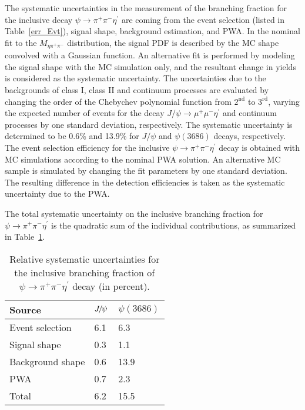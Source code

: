 \documentclass[twocolumn,showpacs,aps,prd]{revtex4-1}
\newcommand{\psip}{\psi(3686)}
\begin{document}
The systematic uncertainties in the measurement of the branching fraction for the inclusive decay $\psi \to \pi^+\pi^-\eta^\prime$ are coming from the event selection (listed in Table~\ref{err_Evt}), signal shape, background estimation, and PWA. In the nominal fit
to the $M_{\eta\pi^+\pi^-}$ distribution, the signal PDF is described by the MC shape convolved with a Gaussian function. An alternative
fit is performed by modeling the signal shape with the MC simulation only, and the resultant change in yields is considered as the systematic uncertainty.
The uncertainties due to the backgrounds of class I, class II and continuum processes are evaluated by changing the order of the Chebychev polynomial
function from $2^\text{nd}$ to $3^\text{rd}$, varying the expected number of events for the decay $J/\psi\to \mu^+\mu^-\eta^\prime$  and continuum processes by one standard
deviation, respectively. The systematic uncertainty is determined to be 0.6\% and 13.9\% for $J/\psi$ and $\psip$ decays, respectively. The event selection efficiency for the inclusive $\psi \to \pi^+\pi^-\eta^\prime$ decay is obtained with MC simulations according to the nominal PWA solution. An alternative MC sample is simulated by changing the fit parameters by one standard deviation. The resulting difference in the detection efficiencies is taken as the systematic uncertainty due to the PWA.

The total systematic uncertainty on the inclusive branching fraction for $\psi \to \pi^+\pi^-\eta^\prime$
 is the quadratic sum of the individual contributions, as summarized in Table~\ref{sysfitetaptotal}.
%
\begin{table}[tb]
\begin{center}
  \caption{Relative systematic uncertainties for the inclusive branching fraction of $\psi \to \pi^+\pi^-\eta^\prime$ decay (in percent).}
  \label{sysfitetaptotal}
  \setlength{\extrarowheight}{1.0ex}
  \renewcommand{\arraystretch}{1.0}
  \vspace{0.2cm}
  \begin{tabular}{p{3.0cm}m{2.5cm}<{\centering}m{2.0cm}<{\centering}}
  \hline\hline
  Source                   &${J\mskip -3mu/\mskip -2mu\psi\mskip 2mu}$  &$\psip$ \\
  \hline
  Event selection          &6.1                                      &6.3            \\
  Signal shape             &0.3                                      &1.1            \\
  Background shape         &0.6                                      &13.9            \\
  PWA                      &0.7                                      &2.3            \\\hline
  Total                    &6.2                                      &15.5            \\
  \hline\hline
  \end{tabular}
  \vspace{-0.2cm}
  \end{center}
\end{table}
%
\end{document}
